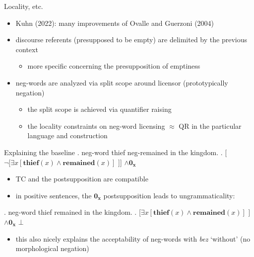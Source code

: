 \documentclass[
  ignorenonframetext,
]{beamer}
\providecommand{\tightlist}{%
  \setlength{\itemsep}{0pt}\setlength{\parskip}{0pt}}\usepackage{longtable,booktabs,array}
\begin{document}
\begin{frame}
\begin{block}{Locality, etc.}
\protect\hypertarget{locality-etc.}{}
\begin{itemize}
\tightlist
\item
  Kuhn (2022): many improvements of Ovalle and Guerzoni (2004)
\item
  discourse referents (presupposed to be empty) are delimited by the
  previous context

  \begin{itemize}
  \tightlist
  \item
    more specific concerning the presupposition of emptiness
  \end{itemize}
\item
  neg-words are analyzed via split scope around licensor (prototypically
  negation)

  \begin{itemize}
  \tightlist
  \item
    the split scope is achieved via quantifier raising
  \item
    the locality constraints on neg-word licensing \(\approx\) QR in the
    particular language and construction
  \end{itemize}
\end{itemize}
\end{block}
\end{frame}

\begin{frame}
\begin{block}{Explaining the baseline}
\protect\hypertarget{explaining-the-baseline}{}
\ex. neg-word thief neg-remained in the kingdom. \a.
{[}\(\neg[\exists x[\mathbf{thief}(x) \wedge \mathbf{remained}(x)]\)
{]}{]} \(\wedge \mathbf{0_x}\)

\begin{itemize}
\tightlist
\item
  TC and the postsupposition are compatible
\item
  in positive sentences, the \(\mathbf{0_x}\) postsupposition leads to
  ungrammaticality:
\end{itemize}

\ex. neg-word thief remained in the kingdom. \a.
{[}\(\exists x[\mathbf{thief}(x) \wedge \mathbf{remained}(x)]\) {]}
\(\wedge \mathbf{0_x}\) \hfill \(\bot\)

\begin{itemize}
\tightlist
\item
  this also nicely explains the acceptability of neg-words with
  \emph{bez} `without' (no morphological negation)
\end{itemize}
\end{block}
\end{frame}
\end{document}
